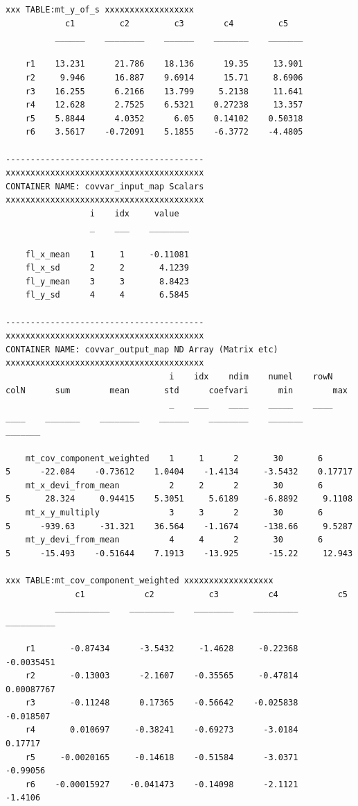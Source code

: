 \documentclass[
]{book}
\begin{document}
\begin{verbatim}
xxx TABLE:mt_y_of_s xxxxxxxxxxxxxxxxxx
            c1         c2         c3        c4         c5   
          ______    ________    ______    _______    _______

    r1    13.231      21.786    18.136      19.35     13.901
    r2     9.946      16.887    9.6914      15.71     8.6906
    r3    16.255      6.2166    13.799     5.2138     11.641
    r4    12.628      2.7525    6.5321    0.27238     13.357
    r5    5.8844      4.0352      6.05    0.14102    0.50318
    r6    3.5617    -0.72091    5.1855    -6.3772    -4.4805

----------------------------------------
xxxxxxxxxxxxxxxxxxxxxxxxxxxxxxxxxxxxxxxx
CONTAINER NAME: covvar_input_map Scalars
xxxxxxxxxxxxxxxxxxxxxxxxxxxxxxxxxxxxxxxx
                 i    idx     value  
                 _    ___    ________

    fl_x_mean    1     1     -0.11081
    fl_x_sd      2     2       4.1239
    fl_y_mean    3     3       8.8423
    fl_y_sd      4     4       6.5845

----------------------------------------
xxxxxxxxxxxxxxxxxxxxxxxxxxxxxxxxxxxxxxxx
CONTAINER NAME: covvar_output_map ND Array (Matrix etc)
xxxxxxxxxxxxxxxxxxxxxxxxxxxxxxxxxxxxxxxx
                                 i    idx    ndim    numel    rowN    colN      sum        mean       std      coefvari      min        max  
                                 _    ___    ____    _____    ____    ____    _______    ________    ______    ________    _______    _______

    mt_cov_component_weighted    1     1      2       30       6       5      -22.084    -0.73612    1.0404    -1.4134     -3.5432    0.17717
    mt_x_devi_from_mean          2     2      2       30       6       5       28.324     0.94415    5.3051     5.6189     -6.8892     9.1108
    mt_x_y_multiply              3     3      2       30       6       5      -939.63     -31.321    36.564    -1.1674     -138.66     9.5287
    mt_y_devi_from_mean          4     4      2       30       6       5      -15.493    -0.51644    7.1913    -13.925      -15.22     12.943

xxx TABLE:mt_cov_component_weighted xxxxxxxxxxxxxxxxxx
              c1            c2           c3          c4            c5    
          ___________    _________    ________    _________    __________

    r1       -0.87434      -3.5432     -1.4628     -0.22368    -0.0035451
    r2       -0.13003      -2.1607    -0.35565     -0.47814    0.00087767
    r3       -0.11248      0.17365    -0.56642    -0.025838     -0.018507
    r4       0.010697     -0.38241    -0.69273      -3.0184       0.17717
    r5     -0.0020165     -0.14618    -0.51584      -3.0371      -0.99056
    r6    -0.00015927    -0.041473    -0.14098      -2.1121       -1.4106


\end{verbatim}
\end{document}
